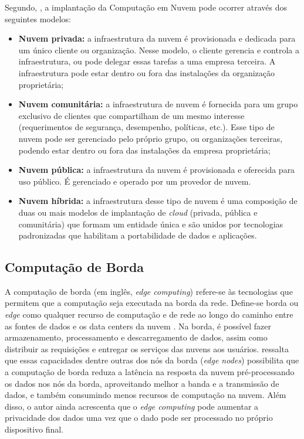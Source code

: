 Segundo, , a implantação da Computação em Nuvem pode
ocorrer através dos seguintes modelos:

\begin{itemize}
    
    \item \textbf{Nuvem privada:} a infraestrutura da nuvem é provisionada e
    dedicada para um único cliente ou organização. Nesse modelo, o cliente
    gerencia e controla a infraestrutura, ou pode delegar essas tarefas a uma
    empresa terceira. A infraestrutura pode estar dentro ou fora das instalações
    da organização proprietária;

    \item \textbf{Nuvem comunitária:} a infraestrutura de nuvem é fornecida para
    um grupo exclusivo de clientes que compartilham de um mesmo interesse
    (requerimentos de segurança, desempenho, políticas, etc.). Esse tipo de
    nuvem pode ser gerenciado pelo próprio grupo, ou organizações terceiras,
    podendo estar dentro ou fora das instalações da empresa proprietária;

    \item \textbf{Nuvem pública:} a infraestrutura da nuvem é provisionada e
    oferecida para uso público. É gerenciado e operado por um provedor de nuvem.
    
    \item \textbf{Nuvem híbrida:} a infraestrutura desse tipo de nuvem é uma
    composição de duas ou mais modelos de implantação de \emph{cloud} (privada,
    pública e comunitária) que formam um entidade única e são unidos por
    tecnologias padronizadas que habilitam a portabilidade de dados e
    aplicações.

\end{itemize}

\subsection{Computação de Borda}

A computação de borda (em inglês, \emph{edge computing}) refere-se às
tecnologias que permitem que a computação seja executada na borda da rede.
Define-se borda ou \emph{edge} como qualquer recurso de computação e de rede ao
longo do caminho entre as fontes de dados e os data centers da nuvem
\cite{Shi2016}. Na borda, é possível fazer armazenamento, processamento e
descarregamento de dados, assim como distribuir as requisições e entregar os
serviços das nuvens aos usuários.  ressalta que essas
capacidades dentre outras dos nós da borda (\emph{edge nodes}) possibilita que a
computação de borda reduza a latência na resposta da nuvem pré-processando os
dados nos nós da borda, aproveitando melhor a banda e a transmissão de dados, e
também consumindo menos recursos de computação na nuvem. Além disso, o autor
ainda acrescenta que o \emph{edge computing} pode aumentar a privacidade dos
dados uma vez que o dado pode ser processado no próprio dispositivo final.

